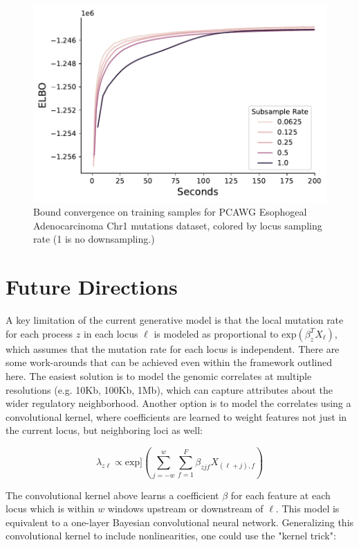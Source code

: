 \documentclass{article}
\begin{document}
\begin{figure}[!htb] \label{svi_fig}
\caption{Bound convergence on training samples for PCAWG Esophogeal Adenocarcinoma Chr1 mutations dataset, colored by locus sampling rate (1 is no downsampling.)}
\centering
\includegraphics[scale=0.5]{svi_subsampling.pdf}
\end{figure}

\section{Future Directions}

A key limitation of the current generative model is that the local mutation rate for each process $z$ in each locus $\ell$ is modeled as proportional to $\textrm{exp}(\beta_z^T X_\ell)$, which assumes that the mutation rate for each locus is independent. There are some work-arounds that can be achieved even within the framework outlined here. The easiest solution is to model the genomic correlates at multiple resolutions (e.g. 10Kb, 100Kb, 1Mb), which can capture attributes about the wider regulatory neighborhood. Another option is to model the correlates using a convolutional kernel, where coefficients are learned to weight features not just in the current locus, but neighboring loci as well:

\begin{equation}
\lambda_{z\ell} \propto \textrm{exp}] \left( \sum_{j=-w}^w \sum_{f=1}^F \beta_{zjf} X_{(\ell+j),f} \right)
\end{equation}

The convolutional kernel above learns a coefficient $\beta$ for each feature at each locus which is within $w$ windows upstream or downstream of $\ell$. This model is equivalent to a one-layer Bayesian convolutional neural network. Generalizing this convolutional kernel to include nonlinearities, one could use the "kernel trick": 
\end{document}
